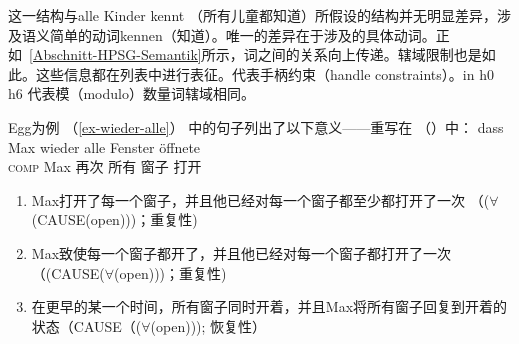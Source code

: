 这一结构与alle Kinder kennt （所有儿童都知道）所假设的结构并无明显差异，涉及语义简单的动词kennen（知道）。唯一的差异在于涉及的具体动词。正如~\ref{Abschnitt-HPSG-Semantik}所示，词之间的关系向上传递。辖域限制也是如此。这些信息都在列表中进行表征。\hcons 代表手柄约束（handle constraints）。\qeq in h0 \qeq h6 代表模（modulo）数量词辖域相同。

Egg为例 （\ref{ex-wieder-alle}） 中的句子列出了以下意义——重写在 （）中：
\ea
\label{ex-wieder-alle-zwei}
\gll dass Max wieder alle Fenster öffnete\\
	 \textsc{comp} Max 再次 所有 窗子 打开\\
\z
\begin{enumerate}
\item Max打开了每一个窗子，并且他已经对每一个窗子都至少都打开了一次 （($\forall$(CAUSE(open)))；重复性)
\item Max致使每一个窗子都开了，并且他已经对每一个窗子都打开了一次 （(CAUSE($\forall$(open)))；重复性)
\item 在更早的某一个时间，所有窗子同时开着，并且Max将所有窗子回复到开着的状态（CAUSE（($\forall$(open))); 恢复性）
\end{enumerate}


